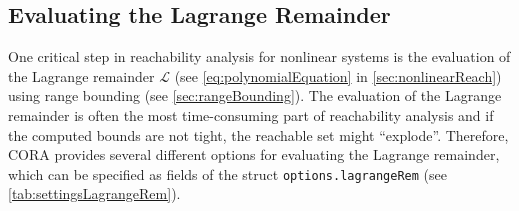 \subsection{Evaluating the Lagrange Remainder}

One critical step in reachability analysis for nonlinear systems is the evaluation of the Lagrange remainder $\mathcal{L}$ (see \eqref{eq:polynomialEquation} in \cref{sec:nonlinearReach}) using range bounding (see \cref{sec:rangeBounding}). The evaluation of the Lagrange remainder is often the most time-consuming part of reachability analysis and if the computed bounds are not tight, the reachable set might ``explode''. Therefore, CORA provides several different options for evaluating the Lagrange remainder, which can be specified as fields of the struct \texttt{options.lagrangeRem} (see \cref{tab:settingsLagrangeRem}).


